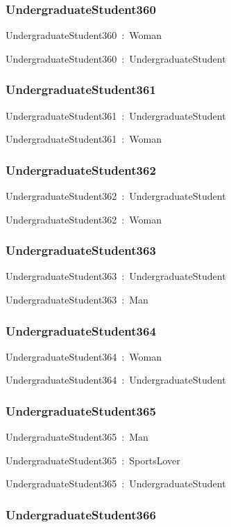 \documentclass{article}
\begin{document}
\subsubsection*{UndergraduateStudent360}

UndergraduateStudent360~:~Woman

UndergraduateStudent360~:~UndergraduateStudent

\subsubsection*{UndergraduateStudent361}

UndergraduateStudent361~:~UndergraduateStudent

UndergraduateStudent361~:~Woman

\subsubsection*{UndergraduateStudent362}

UndergraduateStudent362~:~UndergraduateStudent

UndergraduateStudent362~:~Woman

\subsubsection*{UndergraduateStudent363}

UndergraduateStudent363~:~UndergraduateStudent

UndergraduateStudent363~:~Man

\subsubsection*{UndergraduateStudent364}

UndergraduateStudent364~:~Woman

UndergraduateStudent364~:~UndergraduateStudent

\subsubsection*{UndergraduateStudent365}

UndergraduateStudent365~:~Man

UndergraduateStudent365~:~SportsLover

UndergraduateStudent365~:~UndergraduateStudent

\subsubsection*{UndergraduateStudent366}
\end{document}
